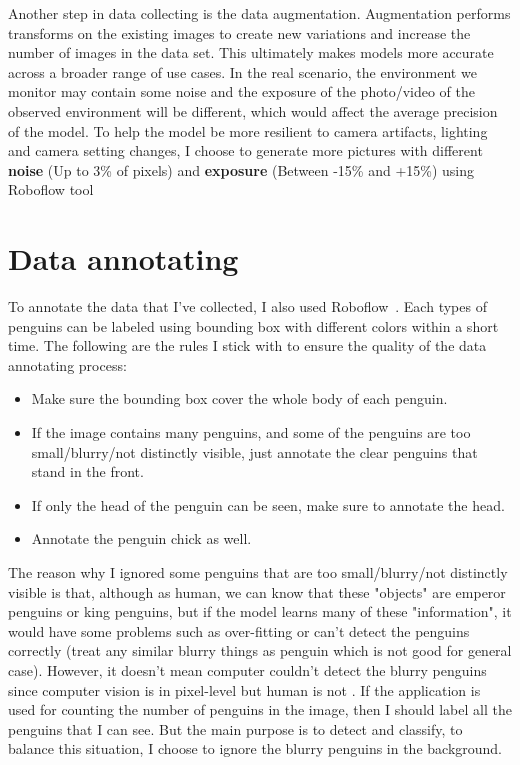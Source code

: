 \documentclass[runningheads]{llncs}
\begin{document}
Another step in data collecting is the data augmentation. Augmentation performs transforms on the existing images to create new variations and increase the number of images in the data set. This ultimately makes models more accurate across a broader range of use cases. 
In the real scenario, the environment we monitor may contain some noise and the exposure of the photo/video of the observed environment will be different, which would affect the average precision of the model. To help the model be more resilient to camera artifacts, lighting and camera setting changes, I choose to generate more pictures with different \textbf{noise} (Up to 3\% of pixels) and \textbf{exposure} (Between -15\% and +15\%) using Roboflow tool~\cite{ref_roboflow}


\section{Data annotating}
To annotate the data that I've collected, I also used Roboflow~\cite{ref_roboflow}. Each types of penguins can be labeled using bounding box with different colors within a short time. 
The following are the rules I stick with to ensure the quality of the data annotating process:
\begin{itemize}
  \item Make sure the bounding box cover the whole body of each penguin.
  \item If the image contains many penguins, and some of the penguins are too small/blurry/not distinctly visible, just annotate the clear penguins that stand in the front.
  \item If only the head of the penguin can be seen, make sure to annotate the head.
  \item Annotate the penguin chick as well.
\end{itemize}
The reason why I ignored some penguins that are too small/blurry/not distinctly visible is that, although as human, we can know that these "objects" are emperor penguins or king penguins, but if the model learns many of these "information", it would have some problems such as over-fitting or can't detect the penguins correctly (treat any similar blurry things as penguin which is not good for general case). However, it doesn't mean computer couldn't detect the blurry penguins since computer vision is in pixel-level but human is not . If the application is used for counting the number of penguins in the image, then I should label all the penguins that I can see.
But the main purpose is to detect and classify, to balance this situation, I choose to ignore the blurry penguins in the background.
\end{document}
